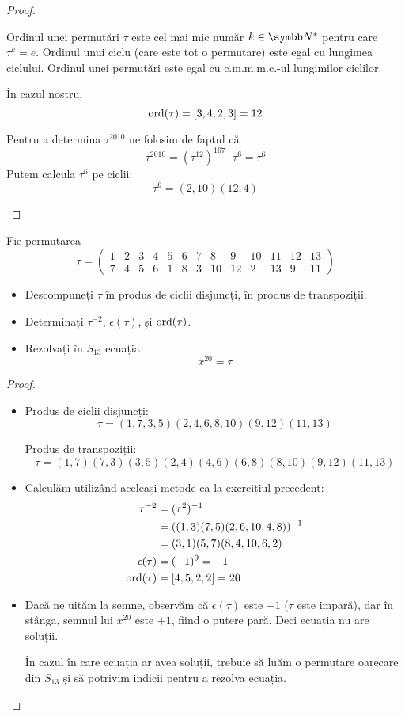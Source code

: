 \begin{proof}
\begin{itemize}
    Ordinul unei permutări \(\tau\) este cel mai mic număr \(k \in \naturals^*\) pentru care \(\tau^k = e\). Ordinul unui ciclu (care este tot o permutare) este egal cu lungimea ciclului. Ordinul unei permutări este egal cu c.m.m.m.c.-ul lungimilor ciclilor.
    
    În cazul nostru,
    \[
        \operatorname{ord}(\tau) = [3, 4, 2, 3] = 12
    \]
    
    Pentru a determina \(\tau^{2010}\) ne folosim de faptul că
    \[
        \tau^{2010} = (\tau^{12})^{167} \cdot \tau^6 = \tau^6
    \]
    Putem calcula \(\tau^{6}\) pe ciclii:
    \[
        \tau^6 = (2, 10) (12, 4)
    \]
\end{itemize}
\end{proof}

\begin{exercise}
Fie permutarea
\[
\tau = \begin{pmatrix}
1 & 2 & 3 & 4 & 5 & 6 & 7 & 8 & 9 & 10 & 11 & 12 & 13 \\
7 & 4 & 5 & 6 & 1 & 8 & 3 & 10 & 12 & 2 & 13 & 9 & 11
\end{pmatrix}
\]
\begin{itemize}
    \item Descompuneți \(\tau\) în produs de ciclii disjuncți, în produs de transpoziții.
    \item Determinați \(\tau^{-2}\), \(\epsilon(\tau)\), și \(\operatorname{ord}(\tau)\).
    \item Rezolvați în \(S_{13}\) ecuația
    \[
        x^{20} = \tau
    \]
\end{itemize}
\end{exercise}
\begin{proof}
~
\begin{itemize}
    \item 
    Produs de ciclii disjuncți:
    \[
        \tau = (1, 7, 3, 5) (2, 4, 6, 8, 10) (9, 12) (11, 13)
    \]
    
    Produs de transpoziții:
    \[
        \tau = (1, 7) (7, 3) (3, 5) (2, 4) (4, 6) (6, 8) (8, 10) (9, 12) (11, 13)
    \]
    
    \item Calculăm utilizând aceleași metode ca la exercițiul precedent:
    \begin{align*}
        \tau^{-2} &= (\tau^2)^{-1} \\
        &= ((1, 3) (7, 5) (2, 6, 10, 4, 8))^{-1} \\
        &= (3, 1) (5, 7) (8, 4, 10, 6, 2) \\
        \epsilon(\tau) &= (-1)^{9} = -1 \\
        \operatorname{ord}(\tau) &= [4, 5, 2, 2] = 20
    \end{align*}
    
    \item Dacă ne uităm la semne, observăm că \(\epsilon(\tau)\) este \(-1\) (\(\tau\) este impară), dar în stânga, semnul lui \(x^{20}\) este \(+1\), fiind o putere pară. Deci ecuația nu are soluții.
    
    În cazul în care ecuația ar avea soluții, trebuie să luăm o permutare oarecare din \(S_{13}\) și să potrivim indicii pentru a rezolva ecuația.
\end{itemize}
\end{proof}
